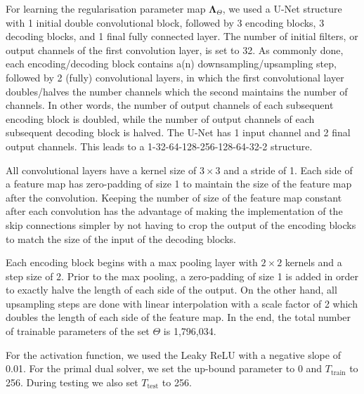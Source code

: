 \documentclass[12pt]{article}
\begin{document}


For learning the regularisation parameter map $\mathbf{\Lambda}_{\Theta}$, we used a U-Net structure with 1 initial double convolutional block, followed by 3 encoding blocks, 3 decoding blocks, and 1 final fully connected layer.
The number of initial filters, or output channels of the first convolution layer, is set to 32.
As commonly done, each encoding/decoding block contains a(n) downsampling/upsampling step, followed by 2 (fully) convolutional layers, in which the first convolutional layer doubles/halves the number channels which the second maintains the number of channels.
In other words, the number of output channels of each subsequent encoding block is doubled, while the number of output channels of each subsequent decoding block is halved.
The U-Net has 1 input channel and 2 final output channels.
This leads to a 1-32-64-128-256-128-64-32-2 structure.

All convolutional layers have a kernel size of $3 \times 3$ and a stride of 1.
Each side of a feature map has zero-padding of size 1 to maintain the size of the feature map after the convolution.
Keeping the number of size of the feature map constant after each convolution has the advantage of making the implementation of the skip connections simpler by not having to crop the output of the encoding blocks to match the size of the input of the decoding blocks.

Each encoding block begins with a max pooling layer with $2 \times 2$ kernels and a step size of 2.
Prior to the max pooling, a zero-padding of size 1 is added in order to exactly halve the length of each side of the output.
On the other hand, all upsampling steps are done with linear interpolation with a scale factor of 2 which doubles the length of each side of the feature map.
In the end, the total number of trainable parameters of the set $\Theta$ is 1,796,034.

For the activation function, we used the Leaky ReLU with a negative slope of 0.01.
For the primal dual solver, we set the up-bound parameter to 0 and $T_{\text{train}}$ to 256.
During testing we also set $T_{\text{test}}$ to 256.
\end{document}
